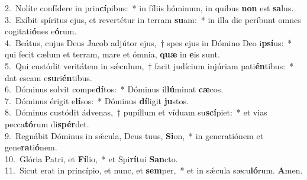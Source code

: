 {2.~}Nolíte confídere in prin\textbf{cí}pibus:~* in fíliis hóminum, in quibus \textbf{non} est \textbf{sa}lus.\\
{3.~}Exíbit spíritus ejus, et revertétur in terram \textbf{su}am:~* in illa die períbunt omnes cogitati\textbf{ó}nes e\textbf{ó}rum.\\
{4.~}Beátus, cujus Deus Jacob adjútor ejus,~† spes ejus in Dómino Deo i\textbf{psí}us:~* qui fecit cælum et terram, mare et ómnia, \textbf{quæ} in \textbf{e}is sunt.\\
{5.~}Qui custódit veritátem in sǽculum,~† facit judícium injúriam pati\textbf{én}tibus:~* dat escam e\textbf{su}ri\textbf{én}tibus.\\
{6.~}Dóminus solvit compe\textbf{dí}tos:~* Dóminus il\textbf{lú}minat \textbf{cæ}cos.\\
{7.~}Dóminus érigit e\textbf{lí}sos:~* Dóminus \textbf{dí}ligit \textbf{ju}stos.\\
{8.~}Dóminus custódit ádvenas,~† pupíllum et víduam su\textbf{scí}piet:~* et vias pecca\textbf{tó}rum di\textbf{spér}det.\\
{9.~}Regnábit Dóminus in sǽcula, Deus tuus, \textbf{Si}on,~* in generatiónem et gene\textbf{ra}ti\textbf{ó}nem.\\
{10.~}Glória Patri, et \textbf{Fí}lio,~* et Spi\textbf{rí}tui \textbf{San}cto.\\
{11.~}Sicut erat in princípio, et nunc, et \textbf{sem}per,~* et in sǽcula sæcu\textbf{ló}rum. \textbf{A}men.\\
